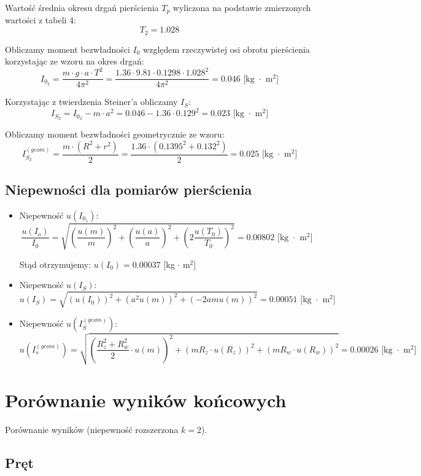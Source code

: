 \documentclass[a4paper,12pts]{article}
\begin{document}
	\flushleft Wartość średnia okresu drgań pierścienia $T_{p}$ wyliczona na podstawie zmierzonych wartości z tabeli 4: $$T_{2} = 1.028$$
	
	\flushleft Obliczamy moment bezwładności $I_0$ względem rzeczywistej osi obrotu pierścienia korzystając ze wzoru na okres drgań:
	$$I_{0_2} = \frac{m \cdot g \cdot a \cdot T^2}{4 \pi^2} = \frac{1.36 \cdot 9.81 \cdot 0.1298 \cdot 1.028^2}{4 \pi^2} = 0.046 \textrm{ [kg $\cdot$ m$^2$]}$$ 
	
	\flushleft Korzystając z twierdzenia Steiner'a obliczamy $I_S$:
	$$I_{S_2} = I_{0_2} - m \cdot a^2 = 0.046 - 1.36 \cdot 0.129^2 = 0.023 \textrm{ [kg $\cdot$ m$^2$]}$$
	
	\flushleft Obliczamy moment bezwładności geometrycznie ze wzoru:
	$$I_{S_2}^{(geom)} = \frac{m \cdot (R^2 + r^2)}{2} = \frac{1.36 \cdot (0.1395^2 + 0.132^2)}{2} = 0.025 \textrm{ [kg $\cdot$ m$^2$]}$$ 

	\subsection{Niepewności dla pomiarów pierścienia}

	\begin{itemize}
		\item 
		Niepewność $u(I_{0_1})$:
		$$\frac{u(I_o)}{I_0}=\sqrt{\left (\frac{u(m)}{m}\right ) ^2+\left ( \frac{u(a)}{a}\right )^2+\left (2 \frac{u(T_0)}{T_0}\right )^2} = 0.00802 \textrm{ [kg $\cdot$ m$^2$]}$$
		
		Stąd otrzymujemy: $u(I_0) = 0.00037$ [kg $\cdot$ m$^2$]
		
		\item 
		Niepewność $u(I_S)$:
		$$u(I_S) = \sqrt{(u(I_0))^2 + (a^2u(m))^2 + (-2amu(m))^2} = 0.00051 \textrm{ [kg $\cdot$ m$^2$]}$$
		
		\item 
		Niepewność $u(I_S^{(geom)})$:
		$$u(I_{s}^{(geom)}) =\sqrt{\left (\frac{R_z^2+R_w^2}{2} \cdot u(m) \right )^2+\left (mR_z \cdot u(R_z) \right )^2+\left (mR_w \cdot u(R_w) \right )^2} = 0.00026 \textrm{ [kg $\cdot$ m$^2$]}$$
	\end{itemize}

	\section{Porównanie wyników końcowych}	
	
	Porównanie wyników (niepewność rozszerzona $k = 2$).
	
	\subsection{Pręt}
	
\end{document}
